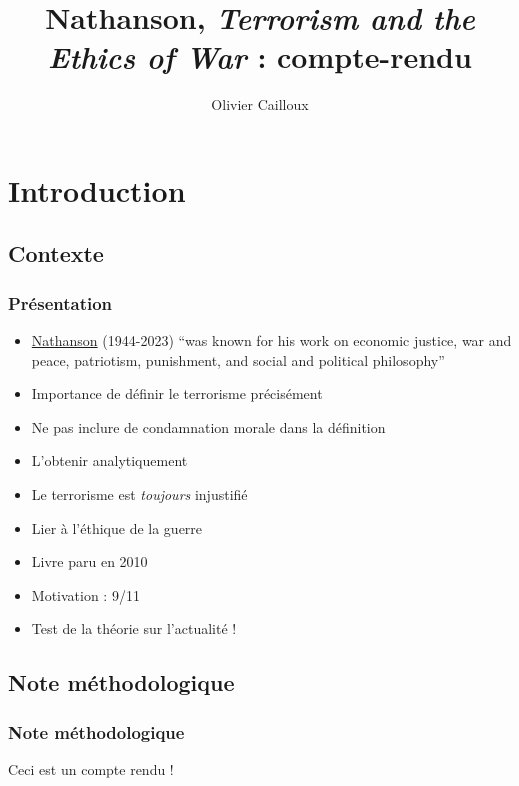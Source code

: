 \documentclass[english, french]{beamer}
\title{Nathanson, \emph{Terrorism and the Ethics of War} : compte-rendu}
\author{Olivier Cailloux}
\date{\formatdate{6}{5}{2025}}
\begin{document}
\begin{frame}[plain]
  \titlepage
\end{frame}
\addtocounter{framenumber}{-1}


\begin{frame}
  \frametitle{}
  \tableofcontents[hideallsubsections, sectionstyle=shaded/show]
\end{frame}

\section{Introduction}
\subsection{Contexte}
\begin{frame}
  \frametitle{Présentation}
  \begin{itemize}
    \item \href{https://dailynous.com/2023/02/14/stephen-nathanson-1944-2023/}{Nathanson} (1944-2023) “was known for his work on economic justice, war and peace, patriotism, punishment, and social and political philosophy”
    \item Importance de définir le terrorisme précisément
    \item Ne pas inclure de condamnation morale dans la définition
    \item L’obtenir analytiquement
    \item Le terrorisme est \emph{toujours} injustifié
    \item Lier à l’éthique de la guerre
    \item Livre paru en 2010
    \item Motivation : 9/11
    \item Test de la théorie sur l’actualité !
  \end{itemize}
\end{frame}

\subsection{Note méthodologique}
\begin{frame}
  \frametitle{Note méthodologique}
  Ceci est un compte rendu !
\end{frame}
\end{document}
